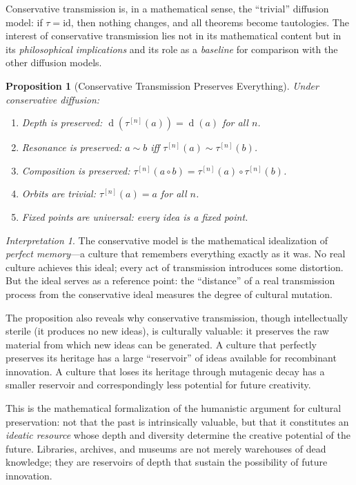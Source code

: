 \documentclass[11pt,openany]{book}
\theoremstyle{definition}
\theoremstyle{plain}
\newtheorem{proposition}[axiom]{Proposition}
\theoremstyle{remark}
\newtheorem{interpretation}[axiom]{Interpretation}
\newcommand{\compose}{\circ}                 %
\newcommand{\res}{\sim}                      %
\newcommand{\depth}{\operatorname{d}}       %
\newcommand{\transmit}{\tau}                 %
\begin{document}
Conservative transmission is, in a mathematical sense, the ``trivial'' diffusion model: if $\transmit = \mathrm{id}$, then nothing changes, and all theorems become tautologies. The interest of conservative transmission lies not in its mathematical content but in its \emph{philosophical implications} and its role as a \emph{baseline} for comparison with the other diffusion models.

\begin{proposition}[Conservative Transmission Preserves Everything]
Under conservative diffusion:
\begin{enumerate}
\item Depth is preserved: $\depth(\transmit^{[n]}(a)) = \depth(a)$ for all $n$.
\item Resonance is preserved: $a \res b$ iff $\transmit^{[n]}(a) \res \transmit^{[n]}(b)$.
\item Composition is preserved: $\transmit^{[n]}(a \compose b) = \transmit^{[n]}(a) \compose \transmit^{[n]}(b)$.
\item Orbits are trivial: $\transmit^{[n]}(a) = a$ for all $n$.
\item Fixed points are universal: every idea is a fixed point.
\end{enumerate}
\end{proposition}

\begin{interpretation}
The conservative model is the mathematical idealization of \emph{perfect memory}---a culture that remembers everything exactly as it was. No real culture achieves this ideal; every act of transmission introduces some distortion. But the ideal serves as a reference point: the ``distance'' of a real transmission process from the conservative ideal measures the degree of cultural mutation.

The proposition also reveals why conservative transmission, though intellectually sterile (it produces no new ideas), is culturally valuable: it preserves the raw material from which new ideas can be generated. A culture that perfectly preserves its heritage has a large ``reservoir'' of ideas available for recombinant innovation. A culture that loses its heritage through mutagenic decay has a smaller reservoir and correspondingly less potential for future creativity.

This is the mathematical formalization of the humanistic argument for cultural preservation: not that the past is intrinsically valuable, but that it constitutes an \emph{ideatic resource} whose depth and diversity determine the creative potential of the future. Libraries, archives, and museums are not merely warehouses of dead knowledge; they are reservoirs of depth that sustain the possibility of future innovation.
\end{interpretation}
\end{document}
